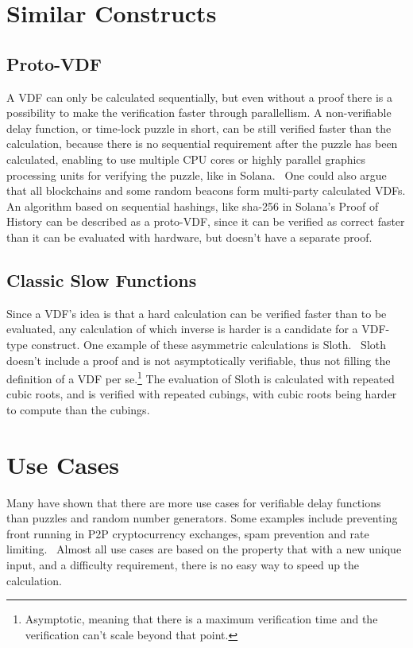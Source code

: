 
\section{Similar Constructs}
\subsection{Proto-VDF}
A VDF can only be calculated sequentially, but even without a proof there is a possibility to make the verification faster through parallellism. A non-verifiable delay function, or time-lock puzzle in short, can be still verified faster than the calculation, because there is no sequential requirement after the puzzle has been calculated, enabling to use multiple CPU cores or highly parallel graphics processing units for verifying the puzzle, like in Solana.~\cite{Yakovenko2018-zn} One could also argue that all blockchains and some random beacons form multi-party calculated VDFs. An algorithm based on sequential hashings, like sha-256 in Solana's Proof of History can be described as a proto-VDF, since it can be verified as correct faster than it can be evaluated with hardware, but doesn't have a separate proof.

\subsection{Classic Slow Functions}
Since a VDF's idea is that a hard calculation can be verified faster than to be evaluated, any calculation of which inverse is harder is a candidate for a VDF-type construct. One example of these asymmetric calculations is Sloth.~\cite{Boneh2018-sm} Sloth doesn't include a proof and is not asymptotically verifiable, thus not filling the definition of a VDF per se.\footnote{Asymptotic, meaning that there is a maximum verification time and the verification can't scale beyond that point.} The evaluation of Sloth is calculated with repeated cubic roots, and is verified with repeated cubings, with cubic roots being harder to compute than the cubings.

\section{Use Cases}
Many have shown that there are more use cases for verifiable delay functions than puzzles and random number generators. Some examples include preventing front running in P2P cryptocurrency exchanges, spam prevention and rate limiting.~\cite{noauthor_undated-hk} Almost all use cases are based on the property that with a new unique input, and a difficulty requirement, there is no easy way to speed up the calculation.

